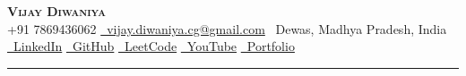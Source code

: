 \documentclass[letterpaper,10pt]{article}
\begin{document}
\begin{center}
  {\Huge\scshape\textbf{Vijay Diwaniya}}\\[4pt]
  \small
  +91 7869436062 \quad\textbar\quad
  \href{mailto:vijay.diwaniya.cg@gmail.com}{\faEnvelope\ vijay.diwaniya.cg@gmail.com} \quad\textbar\quad
  \faMapMarker*\ Dewas, Madhya Pradesh, India \\[4pt]
  \href{https://www.linkedin.com/in/vijay-diwaniya-7b36aa3a4/}{\faLinkedin\ LinkedIn} \quad
  \href{https://github.com/VIJAY33420}{\faGithub\ GitHub} \quad
  \href{https://leetcode.com/u/VIJAY162004/}{\faCode\ LeetCode} \quad
  \href{https://www.youtube.com/@VIJAYDIWANIYA-16}{\faYoutube\ YouTube} \quad
  \href{https://vijaydiwaniya-portfolio.vercel.app/}{\faGlobe\ Portfolio}
\end{center}

\vspace{2pt}
\noindent\rule{\textwidth}{0.4pt}
\vspace{4pt}
\end{document}
